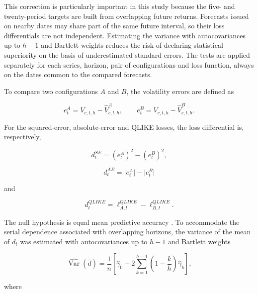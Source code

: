 \documentclass[a4paper,fleqn]{cas-sc}
\begin{document}
This correction is particularly important in this study because the five- and twenty-period targets are built from overlapping future returns. Forecasts issued on nearby dates may share part of the same future interval, so their loss differentials are not independent. Estimating the variance with autocovariances up to \(h-1\) and Bartlett weights reduces the risk of declaring statistical superiority on the basis of underestimated standard errors. The tests are applied separately for each series, horizon, pair of configurations and loss function, always on the dates common to the compared forecasts.

To compare two configurations \(A\) and \(B\), the volatility errors are defined as

\begin{equation}
e^{A}_{t}=V_{c,t,h}-\widehat{V}^{A}_{c,t,h},
\qquad
e^{B}_{t}=V_{c,t,h}-\widehat{V}^{B}_{c,t,h}.
\label{eq:forecast_errors}
\end{equation}

For the squared-error, absolute-error and QLIKE losses, the loss differential is, respectively,

\begin{equation}
d_t^{SE}=(e^{A}_{t})^{2}-(e^{B}_{t})^{2},
\label{eq:dm_se}
\end{equation}

\begin{equation}
d_t^{AE}=\lvert e^{A}_{t}\rvert-\lvert e^{B}_{t}\rvert
\label{eq:dm_ae}
\end{equation}

and

\begin{equation}
d_t^{QLIKE}
=
\ell^{QLIKE}_{A,t}-\ell^{QLIKE}_{B,t}.
\label{eq:dm_qlike}
\end{equation}

The null hypothesis is equal mean predictive accuracy \citep{DieboldMariano1995,HarveyLeybourneNewbold1997}. To accommodate the serial dependence associated with overlapping horizons, the variance of the mean of \(d_t\) was estimated with autocovariances up to \(h-1\) and Bartlett weights

\begin{equation}
\widehat{\operatorname{Var}}(\bar d)
=
\frac{1}{n}
\left[
\widehat{\gamma}_{0}
+2\sum_{k=1}^{h-1}
\left(1-\frac{k}{h}\right)\widehat{\gamma}_{k}
\right],
\label{eq:dm_variance}
\end{equation}

where
\end{document}
